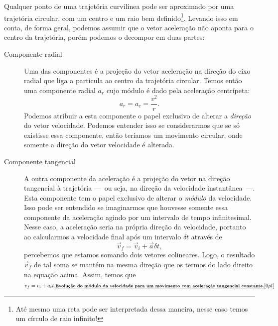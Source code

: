Qualquer ponto de uma trajetória curvilínea pode ser aproximado por uma trajetória circular, com um centro e um raio bem definido\footnote{Até mesmo uma reta pode ser interpretada dessa maneira, nesse caso temos um círculo de raio infinito!}. Levando isso em conta, de forma geral, podemos assumir que o vetor aceleração não aponta para o centro da trajetória, porém podemos o decompor em duas partes:
\begin{description}
  \item[Componente radial] Uma das componentes é a projeção do vetor aceleração na direção do eixo radial que liga a partícula ao centro da trajetória circular. Temos então uma componente radial $a_r$ cujo módulo é dado pela aceleração centrípeta:
  \begin{equation}
    a_r = a_c = \frac{v^2}{r}.
  \end{equation}
  Podemos atribuir a esta componente o papel exclusivo de alterar a \emph{direção} do vetor velocidade. Podemos entender isso se considerarmos que se só existisse essa componente, então teríamos um movimento circular, onde somente a direção do vetor velocidade é alterada.
  \item[Componente tangencial] A outra componente da aceleração é a projeção do vetor na direção tangencial à trajetória ---~ou seja, na direção da velocidade instantânea~---. Esta componente tem o papel exclusivo de alterar o \emph{módulo} da velocidade. Isso pode ser entendido se imaginarmos que houvesse somente essa componente da aceleração agindo por um intervalo de tempo infinitesimal. Nesse caso, a aceleração seria na própria direção da velocidade, portanto ao calcularmos a velocidade final após um intervalo $\delta t$ através de
\begin{equation}
    \vec{v}_f = \vec{v}_i + \vec{a} \delta t,
\end{equation}
%
percebemos que estamos somando dois vetores colineares. Logo, o resultado $\vec{v}_f$ de tal soma se mantém na mesma direção que os termos do lado direito na equação acima. Assim, temos que
\begin{equation}
  v_f = v_i + a_t t. \relax{\footnotesize\emph{\textbf{Evolução do módulo da velocidade para um movimento com aceleração tangencial constante.}}}[0pt]
\end{equation}
\end{description}

